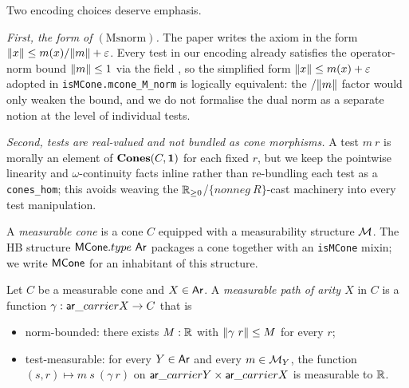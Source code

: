 \begin{remark}
  Two encoding choices deserve emphasis.

  \emph{First, the form of $(\mathrm{Msnorm})$.} The paper writes the
  axiom in the form $\lVert x \rVert \le m(x) / \lVert m \rVert + \varepsilon$.
  Every test in our encoding already satisfies the operator-norm
  bound $\lVert m \rVert \le 1$ via the field
  , so the simplified form
  $\lVert x \rVert \le m(x) + \varepsilon$ adopted in
  \texttt{isMCone.mcone\_M\_norm} is logically equivalent: the
  $/\lVert m \rVert$ factor would only weaken the bound, and we do not
  formalise the dual norm as a separate notion at the level of
  individual tests.

  \emph{Second, tests are real-valued and not bundled as cone
  morphisms.} A test $m\ r$ is morally an element of
  $\mathbf{Cones}(C, \mathbf{1})$ for each fixed $r$, but we keep the
  pointwise linearity and $\omega$-continuity facts inline rather
  than re-bundling each test as a \texttt{cones\_hom}; this avoids
  weaving the $\mathbb{R}_{\geq 0}$/$\{nonneg\ R\}$-cast machinery into every test
  manipulation.
\end{remark}

\begin{definition}\label{def:mcone}
  \rocqok
  A \emph{measurable cone} is a cone $C$ equipped with a measurability
  structure $\mathcal{M}$. The HB structure
  $\mathsf{MCone}.type\ \mathsf{Ar}$ packages a cone together with an
  \texttt{isMCone} mixin; we write $\mathsf{MCone}$ for an inhabitant of this
  structure.
\end{definition}


\begin{definition}\label{def:meas-path}
  \rocqok
  Let $C$ be a measurable cone and $X \in \mathsf{Ar}$. A \emph{measurable
  path of arity $X$} in $C$ is a function $\gamma : \mathsf{ar}\_carrier X
  \to C$ that is
  \begin{itemize}
    \item norm-bounded: there exists $M : \mathbb{R}$ with $\lVert \gamma\ r \rVert
      \le M$ for every $r$;
    \item test-measurable: for every $Y \in \mathsf{Ar}$ and every
      $m \in \mathcal{M}_Y$, the function
      $(s, r) \mapsto m\ s\ (\gamma\ r)$ on
      $\mathsf{ar}\_carrier Y \times \mathsf{ar}\_carrier X$ is measurable to $\mathbb{R}$.
  \end{itemize}
\end{definition}

